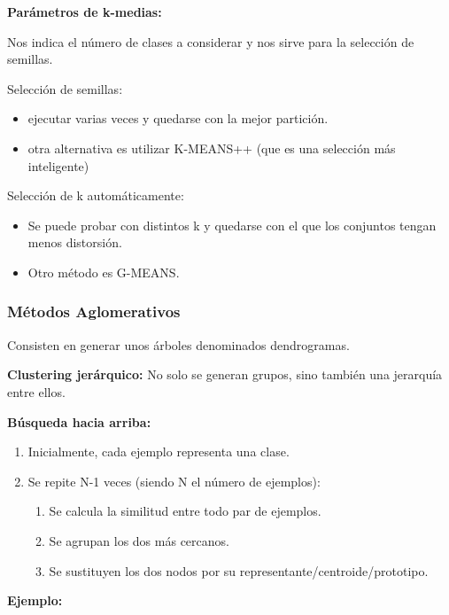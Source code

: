 \documentclass[12pt, twoside, openright]{report} %
\begin{document}
\textbf{Parámetros de k-medias:}

Nos indica el número de clases a considerar y nos sirve para la selección de semillas.

Selección de semillas:
\begin{itemize}
	\item ejecutar varias veces y quedarse con la mejor partición.
	\item otra alternativa es utilizar K-MEANS++ (que es una selección más inteligente)
\end{itemize}

Selección de k automáticamente:
\begin{itemize}
	\item Se puede probar con distintos k y quedarse con el que los conjuntos tengan menos distorsión.
	\item Otro método es G-MEANS.
\end{itemize}

\subsubsection{Métodos Aglomerativos}

Consisten en generar unos árboles denominados dendrogramas.

\textbf{Clustering jerárquico:} No solo se generan grupos, sino también una jerarquía entre ellos.

\textbf{Búsqueda hacia arriba:}
\begin{enumerate}
	\item Inicialmente, cada ejemplo representa una clase.
	\item Se repite N-1 veces (siendo N el número de ejemplos):
	      \begin{enumerate}
		      \item Se calcula la similitud entre todo par de ejemplos.
		      \item Se agrupan los dos más cercanos.
		      \item Se sustituyen los dos nodos por su representante/centroide/prototipo.
	      \end{enumerate}
\end{enumerate}

\textbf{Ejemplo:}
\end{document}
